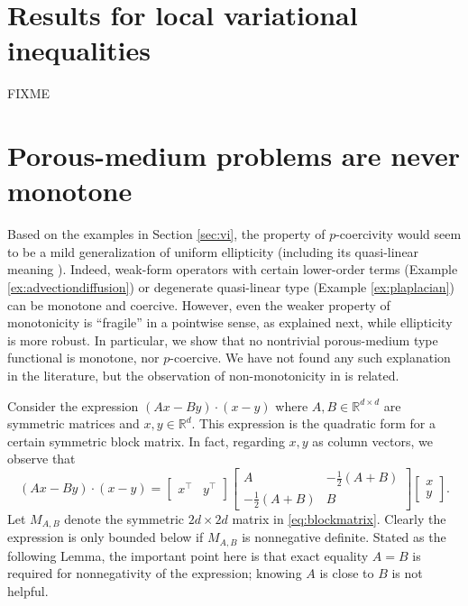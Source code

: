 \documentclass[letterpaper,final,12pt,reqno]{amsart}
\theoremstyle{cstyle}
\theoremstyle{cstyle*}
\theoremstyle{dstyle}
\numberwithin{equation}{section}
\numberwithin{figure}{section}
\numberwithin{table}{section}
\numberwithin{theorem}{section}
\newcommand{\RR}{\mathbb{R}}
\begin{document}
\section{Results for local variational inequalities} \label{sec:results}

FIXME





\small



\normalsize
\appendix

\section{Porous-medium problems are never monotone}

Based on the examples in Section \ref{sec:vi}, the property of $p$-coercivity would seem to be a mild generalization of uniform ellipticity (including its quasi-linear meaning \cite[Section 8.3]{Evans2010}).  Indeed, weak-form operators with certain lower-order terms (Example \ref{ex:advectiondiffusion}) or degenerate quasi-linear type (Example \ref{ex:plaplacian}) can be monotone and coercive.  However, even the weaker property of monotonicity is ``fragile'' in a pointwise sense, as explained next, while ellipticity is more robust.  In particular, we show that no nontrivial porous-medium type functional is monotone, nor $p$-coercive.  We have not found any such explanation in the literature, but the observation of non-monotonicity in \cite{RocknerWang2008} is related.

Consider the expression $(Ax - By)\cdot (x-y)$ where $A,B \in \RR^{d\times d}$ are symmetric matrices and $x,y\in \RR^d$.  This expression is the quadratic form for a certain symmetric block matrix.  In fact, regarding $x,y$ as column vectors, we observe that
\begin{equation}
(Ax - By)\cdot (x-y) = \begin{bmatrix} x^\top & y^\top \end{bmatrix} \begin{bmatrix}
                        A & -\frac{1}{2}(A+B) \\
                        -\frac{1}{2}(A+B) & B \end{bmatrix} \begin{bmatrix} x \\ y \end{bmatrix}. \label{eq:blockmatrix}
\end{equation}
Let $M_{A,B}$ denote the symmetric $2d \times 2d$ matrix in \eqref{eq:blockmatrix}.  Clearly the expression is only bounded below if $M_{A,B}$ is nonnegative definite.  Stated as the following Lemma, the important point here is that exact equality $A=B$ is required for nonnegativity of the expression; knowing $A$ is close to $B$ is not helpful.
\end{document}
